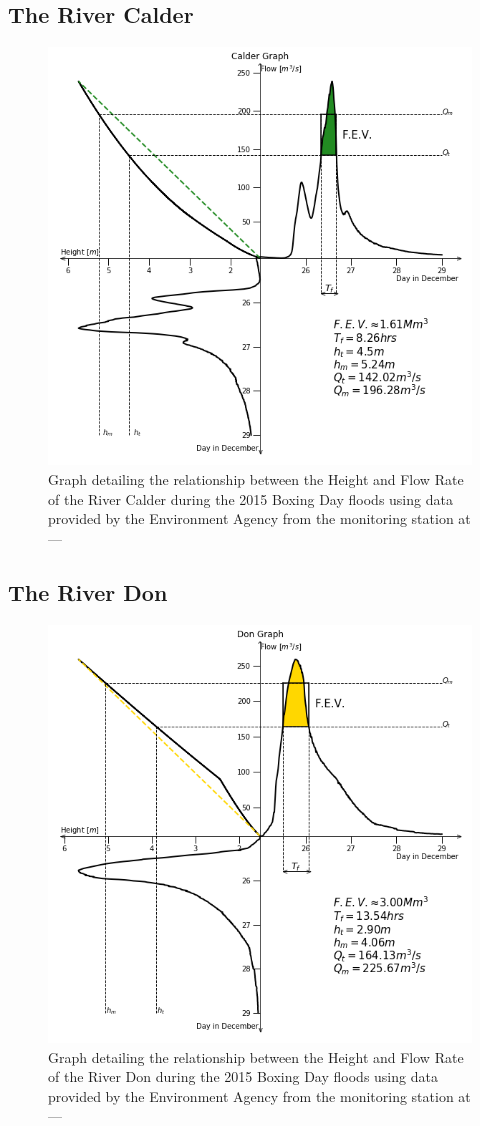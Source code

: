\documentclass[11 pt, a4paper]{article}
\begin{document}
\subsection{The River Calder}
\begin{figure}[H]
\begin{center}
\includegraphics[width=.5\linewidth]{Calder-Quadrant_Graph.png}
\caption{Graph detailing the relationship between the Height and Flow Rate of the River Calder during the 2015 Boxing Day floods using data provided by the Environment Agency from the  monitoring station at ---}
\end{center}
\end{figure}
\subsection{The River Don}
\begin{figure}[H]
\begin{center}
\includegraphics[width=.5\linewidth]{Don-Quadrant_Graph.png}
\caption{Graph detailing the relationship between the Height and Flow Rate of the River Don during the 2015 Boxing Day floods using data provided by the Environment Agency from the  monitoring station at ---}
\end{center}
\end{figure}
\end{document}
